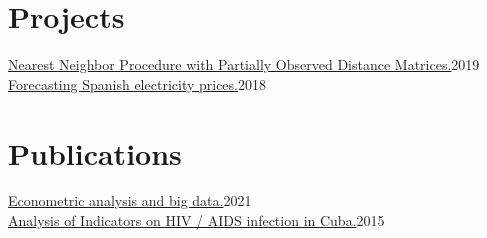 \documentclass{muratcan_cv}
\begin{document}
\section{Projects} 
\datedexperience
	{\href{https://github.com/aldofranco91/TFM_Ing_Mat/blob/master/!!Tesis/Aldo_TFM.pdf}{Nearest Neighbor Procedure with Partially Observed Distance Matrices.}}{2019} 
	 \\
%
\datedexperience
	{\href{https://github.com/aldofranco91/TFM_Big_Data/blob/master/!!Tesis/Aldo_TFM.pdf}{Forecasting Spanish electricity prices.}}{2018} 

\section{Publications}
\datedexperience
{\href{https://www.funcas.es/wp-content/uploads/2021/06/An\%C3\%A1lisis-econom\%C3\%A9trico-y-big-data.pdf}{Econometric analysis and big data.}}{2021} \\
%
\datedexperience
{\href{https://1library.co/document/y4x1l85z-encuesta-indicadores-prevencion-infeccion-vih-sida.html}{Analysis of Indicators on HIV / AIDS infection in Cuba.}}{2015} 

\end{document}
